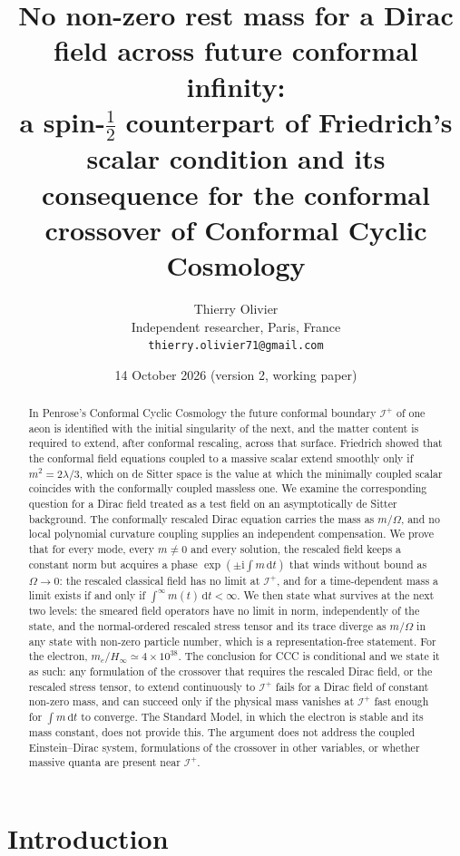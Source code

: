 \documentclass[11pt,a4paper]{article}
\title{\textbf{No non-zero rest mass for a Dirac field across future conformal infinity:\\ a spin-$\tfrac12$ counterpart of Friedrich's scalar condition and its consequence for the conformal crossover of Conformal Cyclic Cosmology}}
\author{Thierry Olivier\\ \small Independent researcher, Paris, France\\ \small \texttt{thierry.olivier71@gmail.com}}
\date{14 October 2026 \quad (version 2, working paper)}
\theoremstyle{definition}
\newcommand{\scri}{\mathscr{I}^{+}}
\newcommand{\dd}{\mathrm{d}}
\newcommand{\ii}{\mathrm{i}}
\begin{document}
\maketitle

\begin{abstract}
In Penrose's Conformal Cyclic Cosmology the future conformal boundary $\scri$ of one aeon is identified with the initial singularity of the next, and the matter content is required to extend, after conformal rescaling, across that surface. Friedrich showed that the conformal field equations coupled to a massive scalar extend smoothly only if $m^{2}=2\lambda/3$, which on de Sitter space is the value at which the minimally coupled scalar coincides with the conformally coupled massless one. We examine the corresponding question for a Dirac field treated as a test field on an asymptotically de Sitter background. The conformally rescaled Dirac equation carries the mass as $m/\Omega$, and no local polynomial curvature coupling supplies an independent compensation. We prove that for every mode, every $m\neq0$ and every solution, the rescaled field keeps a constant norm but acquires a phase $\exp(\pm\ii\int m\,\dd t)$ that winds without bound as $\Omega\to0$: the rescaled classical field has no limit at $\scri$, and for a time-dependent mass a limit exists if and only if $\int^{\infty}m(t)\,\dd t<\infty$. We then state what survives at the next two levels: the smeared field operators have no limit in norm, independently of the state, and the normal-ordered rescaled stress tensor and its trace diverge as $m/\Omega$ in any state with non-zero particle number, which is a representation-free statement. For the electron, $m_{e}/H_{\infty}\simeq4\times10^{38}$. The conclusion for CCC is conditional and we state it as such: any formulation of the crossover that requires the rescaled Dirac field, or the rescaled stress tensor, to extend continuously to $\scri$ fails for a Dirac field of constant non-zero mass, and can succeed only if the physical mass vanishes at $\scri$ fast enough for $\int m\,\dd t$ to converge. The Standard Model, in which the electron is stable and its mass constant, does not provide this. The argument does not address the coupled Einstein--Dirac system, formulations of the crossover in other variables, or whether massive quanta are present near $\scri$.
\end{abstract}

\section{Introduction}
\end{document}
